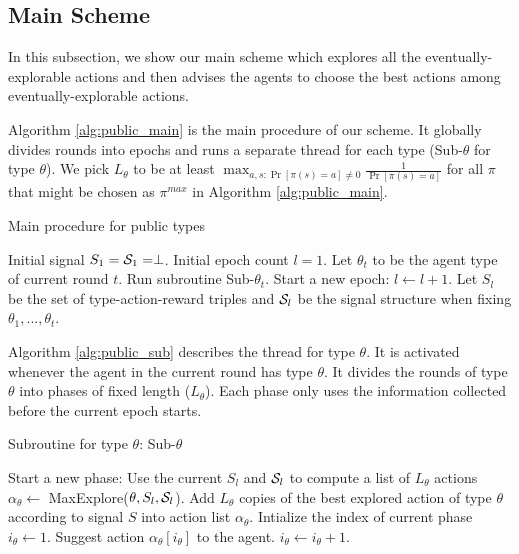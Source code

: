 \subsection{Main Scheme}
\label{sec:public_main}
In this subsection, we show our main scheme which explores all the eventually-explorable actions and then advises the agents to choose the best actions among eventually-explorable actions.

Algorithm \ref{alg:public_main} is the main procedure of our scheme. It globally divides rounds into epochs and runs a separate thread for each type (Sub-$\theta$ for type $\theta$). We pick $L_{\theta}$ to be at least $\max_{a,s: \Pr[\pi(s)=a] \neq 0} \frac{1}{\Pr[\pi(s)=a]}$ for all $\pi$ that might be chosen as $\pi^{max}$ in Algorithm \ref{alg:public_main}.
 \begin{algorithm}[H]
    \caption{Main procedure for public types }
    	\label{alg:public_main}
    \begin{algorithmic}[1]
    	\STATE Initial signal $S_1 = \S_1 = \perp$.
	\STATE Initial epoch count $l = 1$.
		\STATE Let $\theta_t$ to be the agent type of current round $t$. Run subroutine Sub-$\theta_t$.
			\STATE Start a new epoch:
			\STATE $l \leftarrow l + 1$.
			\STATE Let $S_l$ be the set of type-action-reward triples and $\S_l$ be the signal structure when fixing $\theta_1,...,\theta_t$.
		\ENDIF
	\ENDFOR
     \end{algorithmic}
\end{algorithm}

Algorithm \ref{alg:public_sub} describes the thread for type $\theta$. It is activated whenever the agent in the current round has type $\theta$. It divides the rounds of type $\theta$ into phases of fixed length ($L_{\theta}$). Each phase only uses the information collected before the current epoch starts.

 \begin{algorithm}[H]
    \caption{Subroutine for type $\theta$: Sub-$\theta$ }
    	\label{alg:public_sub}
    \begin{algorithmic}[1]
			\STATE Start a new phase:
				\STATE Use the current $S_l$ and $\S_l$ to compute a list of $L_{\theta}$ actions $\alpha_{\theta} \leftarrow $ MaxExplore($\theta, S_l, \S_l$).
			\ELSE
				\STATE Add $L_{\theta}$ copies of the best explored action of type $\theta$ according to signal $S$ into action list $\alpha_{\theta}$.
			\ENDIF
			\STATE Intialize the index of current phase $i_{\theta} \leftarrow 1$.
		\ENDIF
		\STATE Suggest action $\alpha_{\theta} [i_{\theta}]$ to the agent.
		\STATE $i_{\theta} \leftarrow i_{\theta} + 1$.
	\ENDFOR
     \end{algorithmic}
\end{algorithm}


